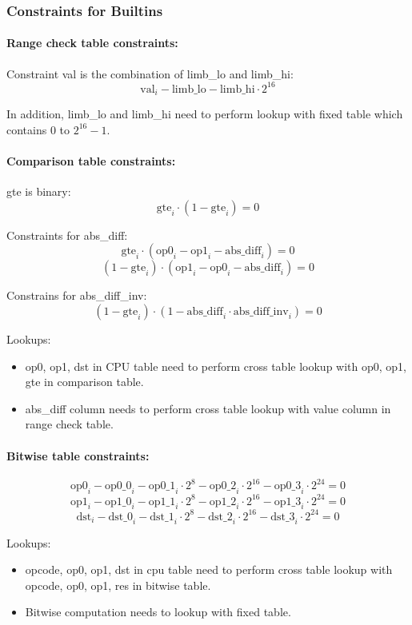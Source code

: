 \subsubsection{Constraints for Builtins} \label{sec:builtins-constraints}

\paragraph*{Range check table constraints:}

Constraint val is the combination of limb\_lo and limb\_hi:
\[ \mathrm{val}_i - \mathrm{limb\_lo} - \mathrm{limb\_hi} \cdot 2^{16} \]

In addition, limb\_lo and limb\_hi need to perform lookup with fixed table which contains 0 to $2^{16}-1$.

\paragraph*{Comparison table constraints:}

gte is binary:
\[ \mathrm{gte}_i \cdot (1 - \mathrm{gte}_i) = 0 \]

Constraints for abs\_diff:
\[ \mathrm{gte}_i \cdot (\mathrm{op0}_i-\mathrm{op1}_i-\mathrm{abs\_diff}_i)=0 \]
\[ (1-\mathrm{gte}_i) \cdot (\mathrm{op1}_i-\mathrm{op0}_i-\mathrm{abs\_diff}_i)=0 \]

Constrains for abs\_diff\_inv:
\[ (1-\mathrm{gte}_i) \cdot (1-\mathrm{abs\_diff}_i \cdot \mathrm{abs\_diff\_inv}_i)=0 \]

Lookups:
\begin{itemize}
    \item op0, op1, dst in CPU table need to perform cross table lookup with op0, op1, gte in comparison table.
    \item abs\_diff column needs to perform cross table lookup with value column in range check table.
\end{itemize}

\paragraph*{Bitwise table constraints:}

\[ \mathrm{op0}_i - \mathrm{op0\_0}_i - \mathrm{op0\_1}_i \cdot 2^{8} - \mathrm{op0\_2}_i \cdot 2^{16}- \mathrm{op0\_3}_i \cdot 2^{24} = 0 \]
\[ \mathrm{op1}_i - \mathrm{op1\_0}_i - \mathrm{op1\_1}_i \cdot 2^{8} - \mathrm{op1\_2}_i \cdot 2^{16}- \mathrm{op1\_3}_i \cdot 2^{24} = 0 \]
\[ \mathrm{dst}_i - \mathrm{dst\_0}_i - \mathrm{dst\_1}_i \cdot 2^{8} - \mathrm{dst\_2}_i \cdot 2^{16}- \mathrm{dst\_3}_i \cdot 2^{24} = 0 \]

Lookups:
\begin{itemize}
    \item opcode, op0, op1, dst in cpu table need to perform cross table lookup with opcode, op0, op1, res in bitwise table.
    \item Bitwise computation needs to lookup with fixed table.
\end{itemize}
